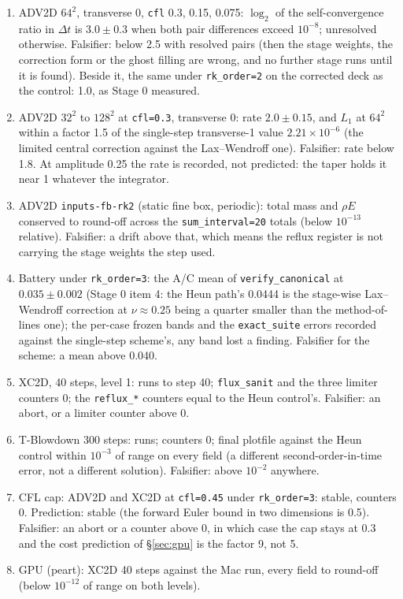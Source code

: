 \documentclass[11pt,a4paper]{article}
\newcommand{\code}[1]{\texttt{\small #1}}
\newcommand{\Dt}{\Delta t}
\begin{document}
\begin{enumerate}[nosep]
\item ADV2D $64^2$, transverse 0, \code{cfl} 0.3, 0.15, 0.075: $\log_2$ of
      the self-convergence ratio in $\Dt$ is $3.0\pm0.3$ when both pair
      differences exceed $10^{-8}$; unresolved otherwise.  Falsifier: below
      2.5 with resolved pairs (then the stage weights, the correction form
      or the ghost filling are wrong, and no further stage runs until it is
      found).  Beside it, the same under \code{rk\_order=2} on the
      corrected deck as the control: 1.0, as Stage 0 measured.
\item ADV2D $32^2$ to $128^2$ at \code{cfl=0.3}, transverse 0: rate
      $2.0\pm0.15$, and $L_1$ at $64^2$ within a factor 1.5 of the
      single-step transverse-1 value $2.21\times10^{-6}$ (the limited
      central correction against the Lax--Wendroff one).  Falsifier: rate
      below 1.8.  At amplitude 0.25 the rate is recorded, not predicted:
      the taper holds it near 1 whatever the integrator.
\item ADV2D \code{inputs-fb-rk2} (static fine box, periodic): total mass and
      $\rho E$ conserved to round-off across the \code{sum\_interval=20}
      totals (below $10^{-13}$ relative).  Falsifier: a drift above that,
      which means the reflux register is not carrying the stage weights
      the step used.
\item Battery under \code{rk\_order=3}: the A/C mean of
      \code{verify\_canonical} at $0.035\pm0.002$ (Stage 0 item 4: the
      Heun path's 0.0444 is the stage-wise Lax--Wendroff correction at
      $\nu\approx0.25$ being a quarter smaller than the method-of-lines
      one); the per-case frozen bands and the \code{exact\_suite} errors
      recorded against the single-step scheme's, any band lost a finding.
      Falsifier for the scheme: a mean above 0.040.
\item XC2D, 40 steps, level 1: runs to step 40; \code{flux\_sanit} and the
      three limiter counters 0; the \code{reflux\_*} counters equal to the
      Heun control's.  Falsifier: an abort, or a limiter counter above 0.
\item T-Blowdown 300 steps: runs; counters 0; final plotfile against the
      Heun control within $10^{-3}$ of range on every field (a different
      second-order-in-time error, not a different solution).  Falsifier:
      above $10^{-2}$ anywhere.
\item CFL cap: ADV2D and XC2D at \code{cfl=0.45} under \code{rk\_order=3}:
      stable, counters 0.  Prediction: stable (the forward Euler bound in
      two dimensions is 0.5).  Falsifier: an abort or a counter above 0,
      in which case the cap stays at 0.3 and the cost prediction of
      \S\ref{sec:gpu} is the factor 9, not 5.
\item GPU (peart): XC2D 40 steps against the Mac run, every field to
      round-off (below $10^{-12}$ of range on both levels).
\end{enumerate}
\end{document}
